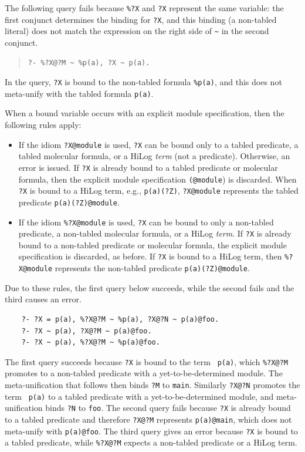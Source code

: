 \documentclass[11pt]{article}
\begin{document}
The following query fails because {\tt \%?X} and {\tt ?X} represent the
same variable: the first conjunct determines the binding for {\tt ?X},
and this binding (a non-tabled literal) does not match the expression on the right side of
\verb|~| in the second conjunct.
\begin{quote}
\begin{verbatim}
?- %?X@?M ~ %p(a), ?X ~ p(a).
\end{verbatim}
\end{quote}
In the query, {\tt ?X} is bound to the non-tabled formula {\tt \%p(a)},
and this does not meta-unify with the tabled formula {\tt p(a)}.

When a bound variable occurs with an explicit module specification, then
the following rules apply:
\begin{itemize}
\item If the idiom {\tt ?X@module} is used, {\tt ?X} can be bound only to a
  tabled predicate, a tabled molecular formula, or a HiLog \emph{term} (not
  a predicate).  Otherwise, an error is issued. If {\tt ?X} is already bound
  to a tabled predicate or molecular formula, then the explicit module
  specification {\tt (@module}) is discarded.  When {\tt ?X} is bound to a
  HiLog term, e.g., {\tt p(a)(?Z)}, {\tt ?X@module} represents the tabled
  predicate {\tt p(a)(?Z)@module}.
\item If the idiom {\tt \%?X@module} is used, {\tt ?X} can be bound to only a
  non-tabled predicate, a non-tabled molecular formula, or a HiLog
  \emph{term}.  If {\tt ?X} is already bound to a non-tabled predicate or
  molecular formula, the explicit module specification is discarded, as
  before.  If {\tt ?X} is bound to a HiLog term, then {\tt \%?X@module}
  represents the non-tabled predicate {\tt p(a)(?Z)@module}.
\end{itemize}
Due to these rules, the first query below succeeds, while the second
fails and the third causes an error.
\begin{verbatim}
    ?- ?X = p(a), %?X@?M ~ %p(a), ?X@?N ~ p(a)@foo.
    ?- ?X ~ p(a), ?X@?M ~ p(a)@foo.
    ?- ?X ~ p(a), %?X@?M ~ %p(a)@foo. 
\end{verbatim}
The first query succeeds because {\tt ?X} is bound to the term {\tt
p(a)}, which {\tt \%?X@?M} promotes to a non-tabled predicate with
a yet-to-be-determined module.  The meta-unification that follows then
binds {\tt ?M} to {\tt main}. Similarly {\tt ?X@?N} promotes the term {\tt
p(a)} to a tabled predicate with a yet-to-be-determined module, and
meta-unification binds {\tt ?N} to {\tt foo}. The second query fails
because {\tt ?X} is already bound to a tabled predicate and therefore
{\tt ?X@?M} represents {\tt p(a)@main}, which does not meta-unify with
{\tt p(a)@foo}.  The third query gives an error because {\tt ?X} is bound
to a tabled predicate, while {\tt \%?X@?M} expects a non-tabled predicate or a
HiLog term.
\end{document}
